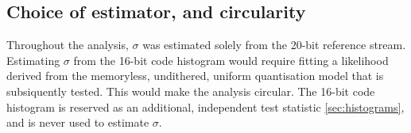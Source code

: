 \subsection{Choice of estimator, and circularity}
\label{sec:circularity}

Throughout the analysis, $\sigma$ was estimated solely from the 20-bit reference stream. Estimating $\sigma$ from the 16-bit code histogram would require fitting a likelihood derived from the memoryless, undithered, uniform quantisation model that is subsiquently tested. This would make the analysis circular. The 16-bit code histogram is reserved as an additional, independent test statistic \cref{sec:histograms}, and is never used to estimate $\sigma$.

%
%
%
%
%
%
